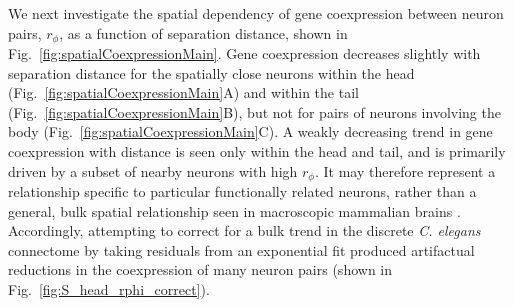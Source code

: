 \documentclass[10pt,letterpaper]{article}
\begin{document}
We next investigate the spatial dependency of gene coexpression between neuron pairs, $r_\phi$, as a function of separation distance, shown in Fig.~\ref{fig:spatialCoexpressionMain}.
Gene coexpression decreases slightly with separation distance for the spatially close neurons within the head (Fig.~\ref{fig:spatialCoexpressionMain}A) and within the tail (Fig.~\ref{fig:spatialCoexpressionMain}B), but not for pairs of neurons involving the body (Fig.~\ref{fig:spatialCoexpressionMain}C).
A weakly decreasing trend in gene coexpression with distance is seen only within the head and tail, and is primarily driven by a subset of nearby neurons with high $r_\phi$.
It may therefore represent a relationship specific to particular functionally related neurons, rather than a general, bulk spatial relationship seen in macroscopic mammalian brains \cite{Fulcher:2016ck}.
Accordingly, attempting to correct for a bulk trend in the discrete \emph{C. elegans} connectome by taking residuals from an exponential fit produced artifactual reductions in the coexpression of many neuron pairs (shown in Fig.~\ref{fig:S_head_rphi_correct}).
\end{document}
